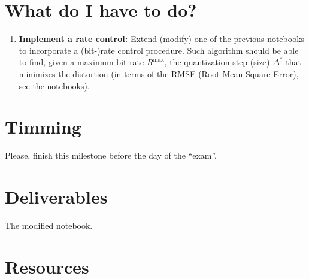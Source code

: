 \section{What do I have to do?}
\begin{enumerate}
\item \textbf{Implement a rate control:} Extend (modify) one of the
  previous notebooks to incorporate a (bit-)rate control
  procedure. Such algorithm should be able to find, given a maximum
  bit-rate $R^\text{max}$, the quantization step (size) $\Delta^*$
  that minimizes the distortion (in terms of the
  \href{https://en.wikipedia.org/wiki/Root-mean-square_deviation}{RMSE
    (Root Mean Square Error)}, see the notebooks).
\end{enumerate}

\section{Timming}
Please, finish this milestone before the day of the ``exam''.

\section{Deliverables}
The modified notebook.

\section{Resources}
\renewcommand{\addcontentsline}[3]{} %



